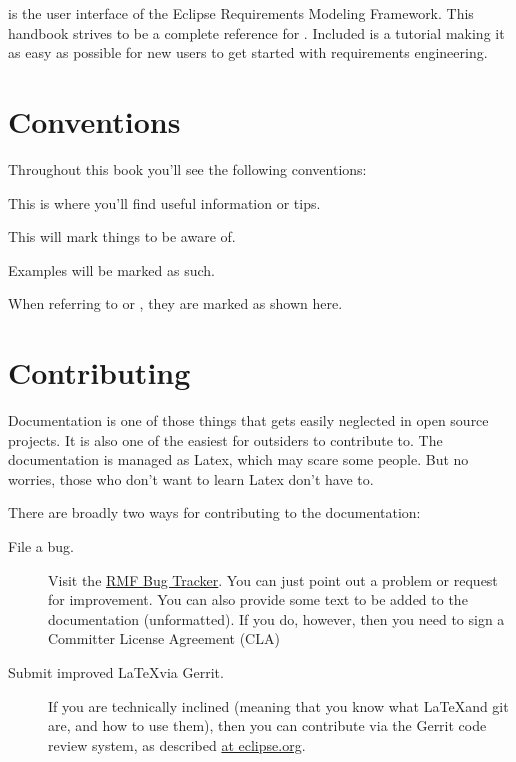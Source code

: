 \pror{} is the user interface of the Eclipse Requirements Modeling Framework.  This handbook strives to be a complete reference for \pror{}.  Included is a tutorial making it as easy as possible for new users to get started with requirements engineering.

\section{Conventions}

Throughout this book you'll see the following conventions:

\begin{info}
This is where you'll find useful information or tips.
\end{info}

\begin{warning}
This will mark things to be aware of.
\end{warning}

\begin{example}
Examples will be marked as such.
\end{example}


When referring to  or , they are marked as shown here.


\section{Contributing}

Documentation is one of those things that gets easily neglected in open source projects.  It is also one of the easiest for outsiders to contribute to.  The documentation is managed as Latex, which may scare some people.  But no worries, those who don't want to learn Latex don't have to.

There are broadly two ways for contributing to the documentation:

\begin{description}
  \item[File a bug.]  Visit the \href{https://bugs.eclipse.org/bugs/enter_bug.cgi?assigned_to=&blocked=&bug_severity=normal&bug_status=NEW&comment=&contenttypeentry=&contenttypemethod=autodetect&data=&dependson=&description=&flag_type-1=X&flag_type-11=X&flag_type-12=X&flag_type-2=X&flag_type-4=X&flag_type-6=X&flag_type-7=X&flag_type-8=X&form_name=enter_bug&keywords=&&op_sys=All&product=MDT.RMF&qa_contact=&rep_platform=All&short_desc=&version=unspecified}{RMF Bug Tracker}.  You can just point out a problem or request for improvement.  You can also provide some text to be added to the documentation (unformatted).  If you do, however, then you need to sign a Committer License Agreement (CLA)
  \item[Submit improved \LaTeX via Gerrit.]  If you are technically inclined (meaning that you know what \LaTeX and git are, and how to use them), then you can contribute via the Gerrit code review system, as described \href{https://wiki.eclipse.org/Gerrit}{at eclipse.org}.
\end{description}

